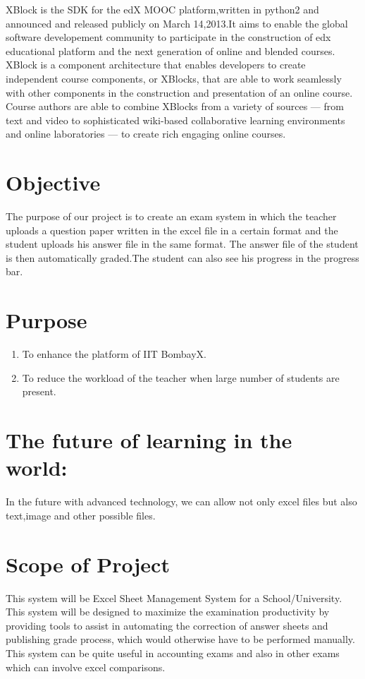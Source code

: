 \documentclass{scrreprt}
\begin{document}
XBlock is the SDK for the edX MOOC platform,written in python2 and announced and released publicly on March 14,2013.It aims 
to enable the global software developement community to participate in the construction of edx educational platform and the
next generation of online and blended courses.\\
XBlock is a component architecture that enables developers to create independent course components, or XBlocks, that are able 
to work seamlessly with other components in the construction and presentation of an online course. Course authors are able to 
combine XBlocks from a variety of sources — from text and video to sophisticated wiki-based collaborative learning environments
and online laboratories — to create rich engaging online courses.

\section{Objective}
The purpose of our project is to create an exam system in which the teacher uploads a question
paper written in the excel file in a certain format and the student uploads his answer file in the same format.
The answer file of the student is then automatically graded.The student can also see his progress in the progress bar.

\section{Purpose}
\begin{enumerate}
\item To enhance the platform of IIT BombayX.
\item To reduce the workload of the teacher when large number of students are present.
\end{enumerate}
\section{The future of learning in the world:}
In the future with advanced technology, we can allow not only excel files but also text,image and other possible files.

\section{Scope of Project}
This system will be Excel Sheet Management System for a School/University. This
system will be designed to maximize the examination productivity by providing tools to
assist in automating the correction of answer sheets and publishing grade process, which
would otherwise have to be performed manually.
This system can be quite useful in accounting exams and also in other exams which can involve excel comparisons.
\end{document}
